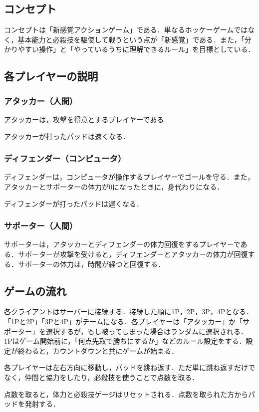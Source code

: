 \documentclass{jarticle}
\begin{document}
\subsection{コンセプト}
コンセプトは「新感覚アクションゲーム」である．単なるホッケーゲームではなく，基本能力と必殺技を駆使して戦うという点が「新感覚」である．また，「分かりやすい操作」と「やっているうちに理解できるルール」を目標としている．\\
%
\subsection{各プレイヤーの説明}
\subsubsection{アタッカー（人間）}
アタッカーは，攻撃を得意とするプレイヤーである.

アタッカーが打ったパッドは速くなる．
%
\subsubsection{ディフェンダー（コンピュータ）}
ディフェンダーは，コンピュータが操作するプレイヤーでゴールを守る．また，アタッカーとサポーターの体力が0になったときに，身代わりになる．

ディフェンダーが打ったパッドは遅くなる．
%
\subsubsection{サポーター（人間）}
サポーターは，アタッカーとディフェンダーの体力回復をするプレイヤーである．サポーターが攻撃を受けると，ディフェンダーとアタッカーの体力が回復する．サポーターの体力は，時間が経つと回復する．
%
\subsection{ゲームの流れ}
各クライアントはサーバーに接続する．接続した順に1P，2P，3P，4Pとなる．「1Pと2P」「3Pと4P」がチームになる．各プレイヤーは「アタッカー」か「サポーター」を選択するが，もし被ってしまった場合はランダムに選択される．1Pはゲーム開始前に，「何点先取で勝ちにするか」などのルール設定をする．設定が終わると，カウントダウンと共にゲームが始まる．

各プレイヤーは左右方向に移動し，パッドを跳ね返す．ただ単に跳ね返すだけでなく，仲間と協力をしたり，必殺技を使うことで点数を取る．

点数を取ると，体力と必殺技ゲージはリセットされる．点数を取られた方からパッドを発射する．
\end{document}
